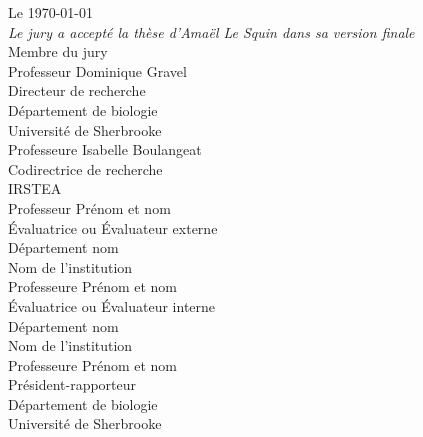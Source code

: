 \documentclass[titlepage,oneside,letterpaper,openright,12pt]{report}
\theoremstyle{theo}
\begin{document}
\thispagestyle{empty}
\begin{center}
\begin{french}
	Le \today \\
	\vspace{1cm}
	\textit{Le jury a accepté la thèse d'Amaël Le Squin dans sa version finale} \\
	\vspace{1cm}
	Membre du jury \\
	\vspace{1cm}
	Professeur Dominique Gravel \\
	Directeur de recherche \\
	Département de biologie \\
	Université de Sherbrooke \\
	\vspace{1cm}
	Professeure Isabelle Boulangeat \\
	Codirectrice de recherche \\
	IRSTEA \\
	\vspace{1cm}
	Professeur Prénom et nom \\
	Évaluatrice ou Évaluateur externe \\
	Département nom \\
	Nom de l'institution \\
	\vspace{1cm}
	Professeure Prénom et nom \\
	Évaluatrice ou Évaluateur interne \\
	Département nom \\
	Nom de l'institution \\
	\vspace{1cm}
	Professeure Prénom et nom \\
	Président-rapporteur \\
	Département de biologie \\
	Université de Sherbrooke
\end{french}
\end{center}







\tableofcontents

\printnomenclature
\end{document}
